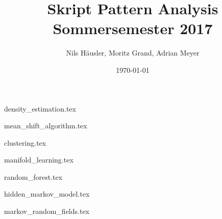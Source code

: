 \documentclass[12p]{article}
\title{Skript Pattern Analysis Sommersemester 2017}
\author{Nils Häusler, Moritz Grand, Adrian Meyer}
\date{\today}
\begin{document}
\begin{titlepage}
  \maketitle
  \thispagestyle{empty}
\end{titlepage}

\newpage
{density_estimation.tex}

\newpage
{mean_shift_algorithm.tex}

\newpage
{clustering.tex}

\newpage
{manifold_learning.tex}

\newpage
{random_forest.tex}

\newpage
{hidden_markov_model.tex}

\newpage
{markov_random_fields.tex}
\end{document}

